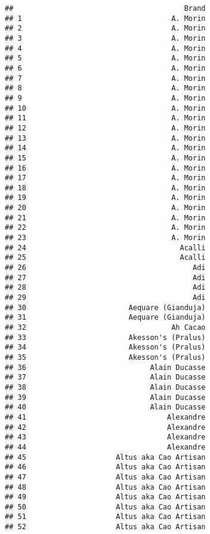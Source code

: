 \documentclass[
]{article}
\begin{document}
\begin{verbatim}
##                                        Brand
## 1                                   A. Morin
## 2                                   A. Morin
## 3                                   A. Morin
## 4                                   A. Morin
## 5                                   A. Morin
## 6                                   A. Morin
## 7                                   A. Morin
## 8                                   A. Morin
## 9                                   A. Morin
## 10                                  A. Morin
## 11                                  A. Morin
## 12                                  A. Morin
## 13                                  A. Morin
## 14                                  A. Morin
## 15                                  A. Morin
## 16                                  A. Morin
## 17                                  A. Morin
## 18                                  A. Morin
## 19                                  A. Morin
## 20                                  A. Morin
## 21                                  A. Morin
## 22                                  A. Morin
## 23                                  A. Morin
## 24                                    Acalli
## 25                                    Acalli
## 26                                       Adi
## 27                                       Adi
## 28                                       Adi
## 29                                       Adi
## 30                        Aequare (Gianduja)
## 31                        Aequare (Gianduja)
## 32                                  Ah Cacao
## 33                        Akesson's (Pralus)
## 34                        Akesson's (Pralus)
## 35                        Akesson's (Pralus)
## 36                             Alain Ducasse
## 37                             Alain Ducasse
## 38                             Alain Ducasse
## 39                             Alain Ducasse
## 40                             Alain Ducasse
## 41                                 Alexandre
## 42                                 Alexandre
## 43                                 Alexandre
## 44                                 Alexandre
## 45                     Altus aka Cao Artisan
## 46                     Altus aka Cao Artisan
## 47                     Altus aka Cao Artisan
## 48                     Altus aka Cao Artisan
## 49                     Altus aka Cao Artisan
## 50                     Altus aka Cao Artisan
## 51                     Altus aka Cao Artisan
## 52                     Altus aka Cao Artisan

\end{verbatim}
\end{document}
